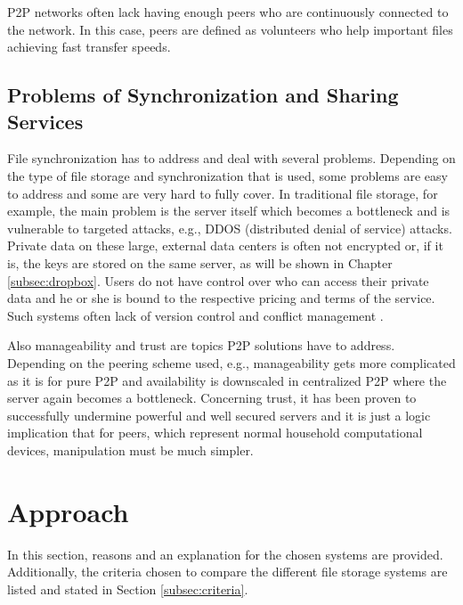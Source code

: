 P2P networks often lack having enough peers who are continuously connected to the network. In this case, peers are defined as volunteers who help important files achieving fast transfer speeds. %

\subsection{Problems of Synchronization and Sharing Services}
File synchronization has to address and deal with several problems. Depending on the type of file storage and synchronization that is used, some problems are easy to address and some are very hard to fully cover. In traditional file storage, for example, the main problem is the server itself which becomes a bottleneck and is vulnerable to targeted attacks, e.g., DDOS (distributed denial of service) attacks. Private data on these large, external data centers is often not encrypted or, if it is, the keys are stored on the same server, as will be shown in Chapter \ref{subsec:dropbox}. Users do not have control over who can access their private data and he or she is bound to the respective pricing and terms of the service. Such systems often lack of version control and conflict management \cite{hive2hive}.

Also manageability and trust are topics P2P solutions have to address. Depending on the peering scheme used, e.g., manageability gets more complicated as it is for pure P2P and availability is downscaled in centralized P2P where the server again becomes a bottleneck. Concerning trust, it has been proven to successfully undermine powerful and well secured servers and it is just a logic implication that for peers, which represent normal household computational devices, manipulation must be much simpler. %

\section{Approach}
\label{sec:approach}
In this section, reasons and an explanation for the chosen systems are provided. Additionally, the criteria chosen to compare the different file storage systems are listed and stated in Section \ref{subsec:criteria}.

